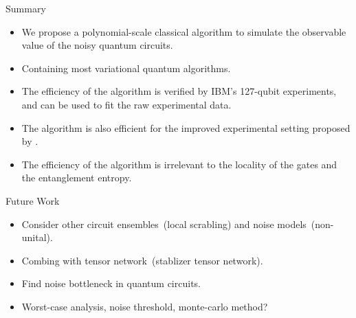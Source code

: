 \documentclass[10pt]{beamer}
\begin{document}
\begin{CJK}{UTF8}{gbsn}
\begin{frame}[fragile]{Summary}
  \begin{itemize}
    \item We propose a polynomial-scale classical algorithm to simulate the observable value of the noisy quantum circuits.
    \item  Containing most variational quantum algorithms.
    \item The efficiency of the algorithm is verified by IBM's 127-qubit experiments, and can be used to fit the raw experimental data.
    \item The algorithm is also efficient for the improved experimental setting proposed by \cite{anand2023classical}.
    \item The efficiency of the algorithm is irrelevant to the locality of the gates and the entanglement entropy. 
  \end{itemize}
\end{frame}


\begin{frame}[fragile]{Future Work}
  \begin{itemize}
    \item Consider other circuit ensembles~(local scrabling) and noise models~(non-unital).
    \item Combing with tensor network~(stablizer tensor network).
    \item Find noise bottleneck in quantum circuits.
    \item Worst-case analysis, noise threshold, monte-carlo method?
  \end{itemize}
\end{frame}
\end{CJK}
\end{document}
